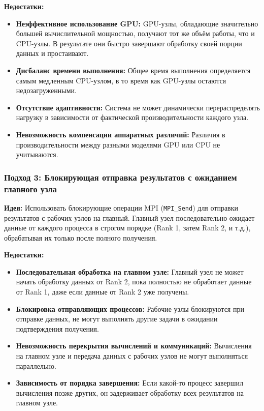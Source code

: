 \documentclass[areaset=advanced]{scrartcl}
\begin{document}
\textbf{Недостатки:}
\begin{itemize}
    \item \textbf{Неэффективное использование GPU:} GPU-узлы, обладающие значительно большей вычислительной мощностью, получают тот же объём работы, что и CPU-узлы. В результате они быстро завершают обработку своей порции данных и простаивают.
    \item \textbf{Дисбаланс времени выполнения:} Общее время выполнения определяется самым медленным CPU-узлом, в то время как GPU-узлы остаются недозагруженными.
    \item \textbf{Отсутствие адаптивности:} Система не может динамически перераспределять нагрузку в зависимости от фактической производительности каждого узла.
    \item \textbf{Невозможность компенсации аппаратных различий:} Различия в производительности между разными моделями GPU или CPU не учитываются.
\end{itemize}

\subsubsection{Подход 3: Блокирующая отправка результатов с ожиданием главного узла}

\textbf{Идея:} Использовать блокирующие операции MPI (\texttt{MPI\_Send}) для отправки результатов с рабочих узлов на главный. Главный узел последовательно ожидает данные от каждого процесса в строгом порядке (Rank 1, затем Rank 2, и т.д.), обрабатывая их только после полного получения.

\textbf{Недостатки:}
\begin{itemize}
    \item \textbf{Последовательная обработка на главном узле:} Главный узел не может начать обработку данных от Rank 2, пока полностью не обработает данные от Rank 1, даже если данные от Rank 2 уже получены.
    \item \textbf{Блокировка отправляющих процессов:} Рабочие узлы блокируются при отправке данных, не могут выполнять другие задачи в ожидании подтверждения получения.
    \item \textbf{Невозможность перекрытия вычислений и коммуникаций:} Вычисления на главном узле и передача данных с рабочих узлов не могут выполняться параллельно.
    \item \textbf{Зависимость от порядка завершения:} Если какой-то процесс завершил вычисления позже других, он задерживает обработку всех результатов на главном узле.
\end{itemize}
\end{document}
